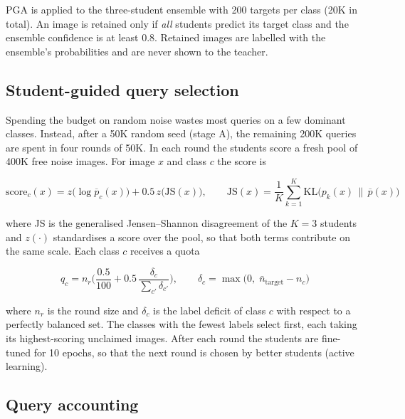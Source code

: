 \documentclass[
  10pt,
]{article}
\begin{document}
PGA is applied to the three-student ensemble with 200 targets per class
(20K in total). An image is retained only if \emph{all} students predict
its target class and the ensemble confidence is at least 0.8. Retained
images are labelled with the ensemble's probabilities and are never
shown to the teacher.

\hypertarget{student-guided-query-selection}{%
\subsection{Student-guided query
selection}\label{student-guided-query-selection}}

Spending the budget on random noise wastes most queries on a few
dominant classes. Instead, after a 50K random seed (stage A), the
remaining 200K queries are spent in four rounds of 50K. In each round
the students score a fresh pool of 400K free noise images. For image
\(x\) and class \(c\) the score is

\begin{equation}\text{score}_c(x)=z\big(\log\overline{p}_c(x)\big)+0.5\,z\big(\mathrm{JS}(x)\big),\qquad \mathrm{JS}(x)=\frac1K\sum_{k=1}^{K}\mathrm{KL}\big(p_k(x)\,\|\,\overline{p}(x)\big)\label{eq:8}\end{equation}

where JS is the generalised Jensen--Shannon disagreement of the \(K=3\)
students and \(z(\cdot)\) standardises a score over the pool, so that
both terms contribute on the same scale. Each class \(c\) receives a
quota

\begin{equation}q_c=n_r\Big(\frac{0.5}{100}+0.5\,\frac{\delta_c}{\sum_{c'}\delta_{c'}}\Big),\qquad \delta_c=\max\big(0,\;\bar n_{\text{target}}-n_c\big)\label{eq:9}\end{equation}

where \(n_r\) is the round size and \(\delta_c\) is the label deficit of
class \(c\) with respect to a perfectly balanced set. The classes with
the fewest labels select first, each taking its highest-scoring
unclaimed images. After each round the students are fine-tuned for 10
epochs, so that the next round is chosen by better students (active
learning).

\hypertarget{query-accounting}{%
\subsection{Query accounting}\label{query-accounting}}
\end{document}
